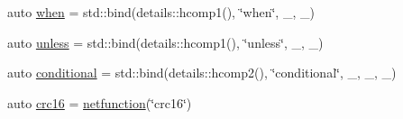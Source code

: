 \begin{DoxyCompactItemize}
\item 
auto \hyperlink{namespacepfq__lang_1_1anonymous__namespace_02default_8hpp_03_a10e1a2f363aa41a978622f322ac6241f}{when} = std\-::bind(details\-::hcomp1(), \char`\"{}when\char`\"{}, \-\_, \-\_)
\item 
auto \hyperlink{namespacepfq__lang_1_1anonymous__namespace_02default_8hpp_03_af01f3831a7b0294b6ffef87a09b481d7}{unless} = std\-::bind(details\-::hcomp1(), \char`\"{}unless\char`\"{}, \-\_, \-\_)
\item 
auto \hyperlink{namespacepfq__lang_1_1anonymous__namespace_02default_8hpp_03_a022d0075edf2fff575b93377aec0c228}{conditional} = std\-::bind(details\-::hcomp2(), \char`\"{}conditional\char`\"{}, \-\_, \-\_, \-\_)
\item 
auto \hyperlink{namespacepfq__lang_1_1anonymous__namespace_02default_8hpp_03_aaa12e1daf6bd2719a3b8592e673acf84}{crc16} = \hyperlink{namespacepfq__lang_a9f546a4602872df5ca74050ecb68a6b3}{netfunction}(\char`\"{}crc16\char`\"{})
\end{DoxyCompactItemize}



